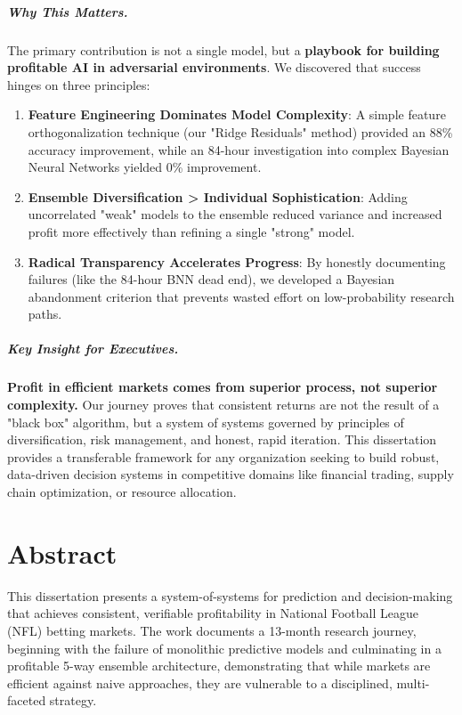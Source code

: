 \documentclass[12pt]{report}  %
\numberwithin{equation}{section}
\theoremstyle{plain}
\theoremstyle{definition}
\theoremstyle{remark}
\begin{document}
\paragraph{Why This Matters.}
The primary contribution is not a single model, but a \textbf{playbook for building profitable AI in adversarial environments}. We discovered that success hinges on three principles:
\begin{enumerate}[itemsep=0pt,parsep=0pt]
  \item \textbf{Feature Engineering Dominates Model Complexity}: A simple feature orthogonalization technique (our "Ridge Residuals" method) provided an 88\% accuracy improvement, while an 84-hour investigation into complex Bayesian Neural Networks yielded 0\% improvement.
  \item \textbf{Ensemble Diversification > Individual Sophistication}: Adding uncorrelated "weak" models to the ensemble reduced variance and increased profit more effectively than refining a single "strong" model.
  \item \textbf{Radical Transparency Accelerates Progress}: By honestly documenting failures (like the 84-hour BNN dead end), we developed a Bayesian abandonment criterion that prevents wasted effort on low-probability research paths.
\end{enumerate}

\paragraph{Key Insight for Executives.}
\textbf{Profit in efficient markets comes from superior process, not superior complexity.} Our journey proves that consistent returns are not the result of a "black box" algorithm, but a system of systems governed by principles of diversification, risk management, and honest, rapid iteration. This dissertation provides a transferable framework for any organization seeking to build robust, data-driven decision systems in competitive domains like financial trading, supply chain optimization, or resource allocation.

\chapter*{Abstract}
This dissertation presents a system-of-systems for prediction and decision-making that achieves consistent, verifiable profitability in National Football League (NFL) betting markets. The work documents a 13-month research journey, beginning with the failure of monolithic predictive models and culminating in a profitable 5-way ensemble architecture, demonstrating that while markets are efficient against naive approaches, they are vulnerable to a disciplined, multi-faceted strategy.
\end{document}
